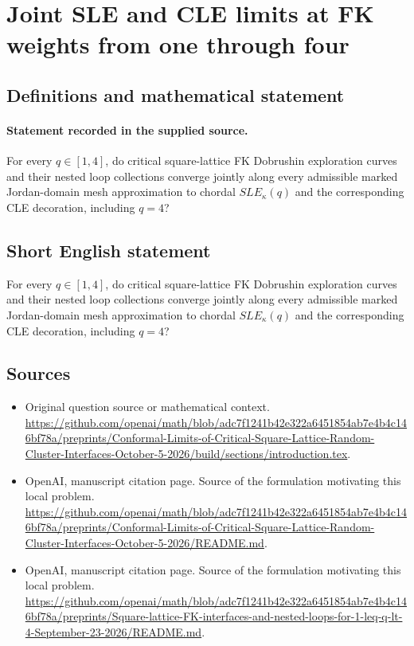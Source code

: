 \documentclass[11pt]{article}
\begin{document}
\section*{Joint SLE and CLE limits at FK weights from one through four}\label{30007357}
\subsection{Definitions and mathematical statement}
\paragraph{Statement recorded in the supplied source.}
For every $q\in [1,4]$, do critical square-lattice FK Dobrushin exploration curves and their nested loop collections converge jointly along every admissible marked Jordan-domain mesh approximation to chordal $SLE_\kappa (q)$ and the corresponding CLE decoration, including $q=4$?
\subsection{Short English statement}
For every $q\in [1,4]$, do critical square-lattice FK Dobrushin exploration curves and their nested loop collections converge jointly along every admissible marked Jordan-domain mesh approximation to chordal $SLE_\kappa (q)$ and the corresponding CLE decoration, including $q=4$?
\subsection{Sources}
\begin{itemize}
\item[S1] Original question source or mathematical context.
\url{https://github.com/openai/math/blob/adc7f1241b42e322a6451854ab7e4b4c146bf78a/preprints/Conformal-Limits-of-Critical-Square-Lattice-Random-Cluster-Interfaces-October-5-2026/build/sections/introduction.tex}.
\item[S2] OpenAI, manuscript citation page. Source of the formulation motivating this local problem.
\url{https://github.com/openai/math/blob/adc7f1241b42e322a6451854ab7e4b4c146bf78a/preprints/Conformal-Limits-of-Critical-Square-Lattice-Random-Cluster-Interfaces-October-5-2026/README.md}.
\item[S3] OpenAI, manuscript citation page. Source of the formulation motivating this local problem.
\url{https://github.com/openai/math/blob/adc7f1241b42e322a6451854ab7e4b4c146bf78a/preprints/Square-lattice-FK-interfaces-and-nested-loops-for-1-leq-q-lt-4-September-23-2026/README.md}.
\end{itemize}
\end{document}
